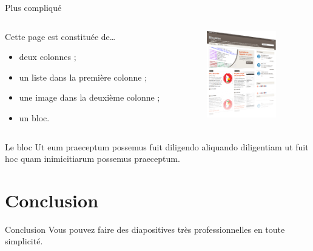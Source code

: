 \documentclass[utf8,compress]{beamer}
\begin{document}
\begin{frame}{Plus compliqué}
\begin{columns}
\begin{column}{0.7\textwidth}
    Cette page est constituée de\dots
    \begin{itemize}
    \item deux colonnes ;
    \item un liste dans la première colonne ;
    \item une image dans la deuxième colonne ;
    \item un bloc.
    \end{itemize}
\end{column}
\begin{column}{0.3\textwidth}
    \begin{figure}[h]
        \includegraphics[width=3cm]{bloghiko-reflet3d.png}
    \end{figure}
\end{column}
\end{columns}
\vspace{1em}
\begin{block}{Le bloc}
    Ut eum praeceptum possemus fuit diligendo aliquando diligentiam ut 
    fuit hoc quam inimicitiarum possemus praeceptum.
\end{block}
\end{frame}


\section{Conclusion}

\begin{frame}{Conclusion}
    Vous pouvez faire des diapositives très professionnelles en toute simplicité.
\end{frame}
\end{document}
